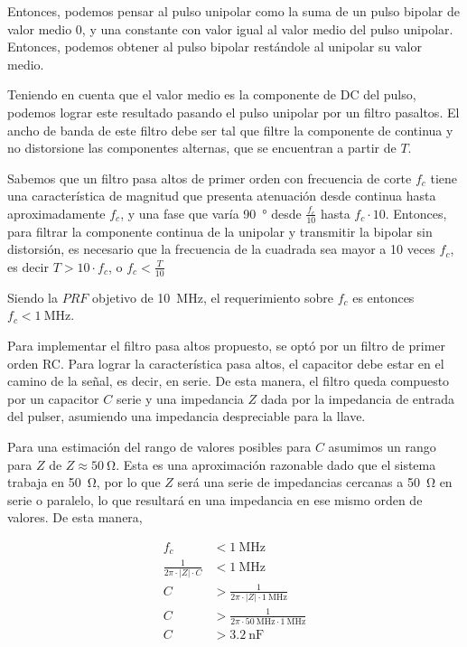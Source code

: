 Entonces, podemos pensar al pulso unipolar como la suma de un pulso bipolar de
valor medio 0, y una constante con valor igual al valor medio del pulso
unipolar. Entonces, podemos obtener al pulso bipolar restándole al unipolar su
valor medio.

Teniendo en cuenta que el valor medio es la componente de DC del pulso, podemos
lograr este resultado pasando el pulso unipolar por un filtro pasaltos. El ancho
de banda de este filtro debe ser tal que filtre la componente de continua y no
distorsione las componentes alternas, que se encuentran a partir de $T$.

Sabemos que un filtro pasa altos de primer orden con frecuencia de corte $f_c$
tiene una característica de magnitud que presenta atenuación desde continua hasta
aproximadamente $f_c$, y una fase que varía \qty{90}{\degree} desde
$\frac{f_c}{10}$ hasta $f_c \cdot 10$. Entonces, para filtrar la componente
continua de la unipolar y transmitir la bipolar sin distorsión,
es necesario que la frecuencia de la cuadrada sea mayor a 10 veces $f_c$, es
decir $T > 10 \cdot f_c$, o $f_c < \frac{T}{10}$

Siendo la $PRF$ objetivo de \qty{10}{\mega\hertz}, el requerimiento sobre $f_c$
es entonces $f_c < \qty{1}{\mega\hertz}$.

Para implementar el filtro pasa altos propuesto, se optó por un filtro de primer
orden RC. Para lograr la característica pasa altos, el capacitor debe estar en
el camino de la señal, es decir, en serie. De esta manera, el filtro queda
compuesto por un capacitor $C$ serie y una impedancia $Z$ dada por la impedancia
de entrada del pulser, asumiendo una impedancia despreciable para la llave.

Para una estimación del rango de valores posibles para $C$ asumimos un rango
para $Z$ de $ Z \approx \qty{50}{\ohm}$. Esta es una aproximación razonable dado
que el sistema trabaja en \qty{50}{\ohm}, por lo que $Z$ será una serie de
impedancias cercanas a \qty{50}{\ohm} en serie o paralelo, lo que resultará en
una impedancia en ese mismo orden de valores. De esta manera,

\begin{equation}
    \begin{aligned}
        f_c &< \qty{1}{\mega\hertz} \\
        \frac{1}{2\pi \cdot |Z| \cdot C} &< \qty{1}{\mega\hertz} \\
        C &> \frac{1}{2\pi \cdot |Z| \cdot \qty{1}{\mega\hertz}} \\
        C &> \frac{1}{2\pi \cdot \qty{50}{\mega\hertz} \cdot \qty{1}{\mega\hertz}} \\
        C &> \qty{3.2}{\nano\farad} \\
    \end{aligned}
\end{equation}

